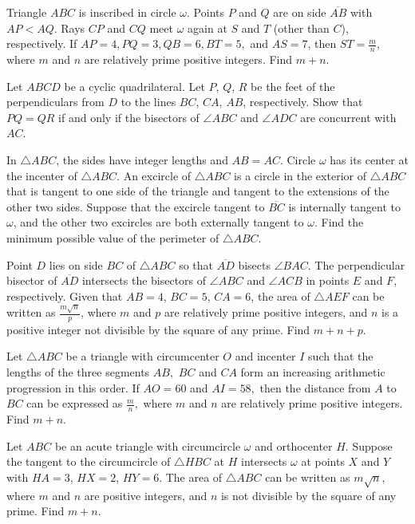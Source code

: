 \documentclass{article}
\begin{document}
\begin{prob}[AIME II 2016/10]{9}
Triangle $ABC$ is inscribed in circle $\omega$. Points $P$ and $Q$ are on side $\overline{AB}$ with $AP<AQ$. Rays $CP$ and $CQ$ meet $\omega$ again at $S$ and $T$ (other than $C$), respectively. If $AP=4,PQ=3,QB=6,BT=5,$ and $AS=7$, then $ST=\frac{m}{n}$, where $m$ and $n$ are relatively prime positive integers. Find $m+n$.
\end{prob}

\begin{prob}[IMO 2003/4]{9}
Let $ABCD$ be a cyclic quadrilateral. Let $P$, $Q$, $R$ be the feet of the perpendiculars from $D$ to the lines $BC$, $CA$, $AB$, respectively. Show that $PQ=QR$ if and only if the bisectors of $\angle ABC$ and $\angle ADC$ are concurrent with $AC$.
\end{prob}

\begin{prob}[AIME I 2019/11]{9}
In $\triangle ABC$, the sides have integer lengths and $AB=AC$. Circle $\omega$ has its center at the incenter of $\triangle ABC$. An excircle of $\triangle ABC$ is a circle in the exterior of $\triangle ABC$ that is tangent to one side of the triangle and tangent to the extensions of the other two sides. Suppose that the excircle tangent to $\overline{BC}$ is internally tangent to $\omega$, and the other two excircles are both externally tangent to $\omega$. Find the minimum possible value of the perimeter of $\triangle ABC$.
\end{prob}

\begin{prob}[AIME I 2020/13]{9}
Point $D$ lies on side $BC$ of $\triangle ABC$ so that $\overline{AD}$ bisects $\angle BAC$. The perpendicular bisector of $\overline{AD}$ intersects the bisectors of $\angle ABC$ and $\angle ACB$ in points $E$ and $F$, respectively. Given that $AB=4$, $BC=5$, $CA=6$, the area of $\triangle AEF$ can be written as $\tfrac{m\sqrt n}p$, where $m$ and $p$ are relatively prime positive integers, and $n$ is a positive integer not divisible by the square of any prime. Find $m+n+p$.
\end{prob}

\begin{prob}[CIME 2019]{13}
Let $\triangle ABC$ be a triangle with circumcenter $O$ and incenter $I$ such that the lengths of the three segments $AB,$ $BC$ and $CA$ form an increasing arithmetic progression in this order$.$ If $AO=60$ and $AI=58,$ then the distance from $A$ to $BC$ can be expressed as $\tfrac mn,$ where $m$ and $n$ are relatively prime positive integers$.$ Find $m+n.$
\end{prob}
    
\begin{prob}[AIME I 2020/15]{13}
Let $ABC$ be an acute triangle with circumcircle $\omega$ and orthocenter $H$. Suppose the tangent to the circumcircle of $\triangle HBC$ at $H$ intersects $\omega$ at points $X$ and $Y$ with $HA=3$, $HX=2$, $HY=6$. The area of $\triangle ABC$ can be written as $m\sqrt n$, where $m$ and $n$ are positive integers, and $n$ is not divisible by the square of any prime. Find $m+n$.
\end{prob}
\end{document}
